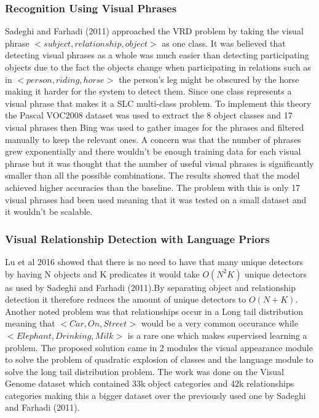 \documentclass{csfyp}
\begin{document}
\subsubsection{Recognition Using Visual Phrases}
Sadeghi and Farhadi (2011) approached the VRD problem by taking the visual phrase $<subject, relationship , object>$ as one class. It was believed that detecting visual phrases as a whole was much easier than detecting participating objects due to the fact the objects change when participating in relations such as in $<person,riding,horse>$ the person’s leg might be obscured by the horse making it harder for the system to detect them. Since one class represents a visual phrase that makes it a SLC multi-class problem. To implement this theory the Pascal VOC2008 dataset was used to extract the 8 object classes and 17 visual phrases then Bing was used to gather images for the phrases and filtered manually to keep the relevant ones.  A concern was that the number of phrases grew exponentially and there wouldn’t be enough training data for each visual phrase but it was thought that the number of useful visual phrases is significantly smaller than all the possible combinations. The results showed that the model achieved higher accuracies than the baseline. The problem with this is only 17 visual phrases had been used meaning that it was tested on a small dataset and it wouldn’t be scalable.

\subsubsection{Visual Relationship Detection with Language Priors}
Lu et al 2016 showed that there is no need to have that many unique detectors by having N objects and K predicates it would take $O(N^2 K)$ unique detectors as used by Sadeghi and Farhadi (2011).By separating object and relationship detection it therefore reduces the amount of unique detectors to $O(N+K)$. Another noted problem was that relationships occur in a Long tail distribution meaning that $<Car,On,Street>$ would be a very common occurance while $<Elephant, Drinking , Milk>$ is a rare one which makes supervised learning a problem. The proposed solution came in 2 modules the visual appearance module to solve the problem of quadratic explosion of classes and the language module to solve the long tail distribution problem. The work was done on the Visual Genome dataset which contained 33k object categories and 42k relationships  categories making this a bigger dataset over the previously used one by Sadeghi and Farhadi (2011). 
\end{document}
